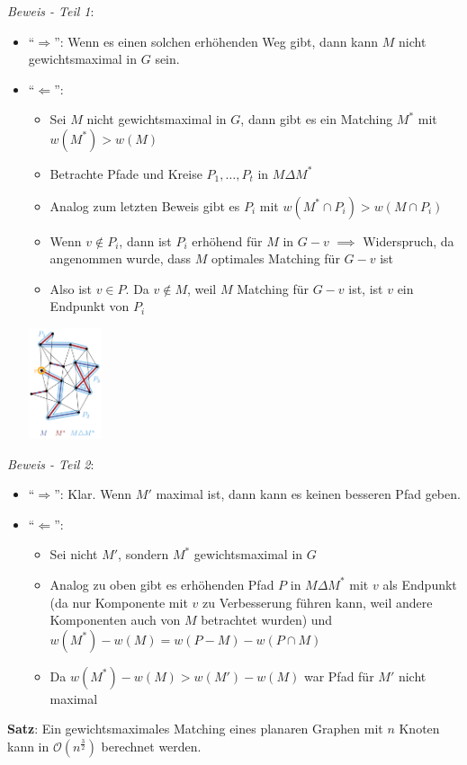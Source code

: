 \textit{Beweis - Teil 1}:
 \begin{itemize}
 	\item \enquote{$\Rightarrow$}: Wenn es einen solchen erhöhenden Weg gibt, dann kann $M$ nicht gewichtsmaximal in $G$ sein.
 	\item \enquote{$\Leftarrow$}:
 	\begin{itemize}
 		\item Sei $M$ nicht gewichtsmaximal in $G$, dann gibt es ein Matching $M^*$ mit $w(M^*)>w(M)$
 		\item Betrachte Pfade und Kreise $P_1,\ldots,P_t$ in $M\Delta M^*$
 		\item Analog zum letzten Beweis gibt es $P_i$ mit $w(M^*\cap P_i)>w(M\cap P_i)$
 		\item Wenn $v\notin P_i$, dann ist $P_i$ erhöhend für $M$ in $G-v$ $\implies$ Widerspruch, da angenommen wurde, dass $M$ optimales Matching für $G-v$ ist
 		\item Also ist $v\in P$. Da $v\notin M$, weil $M$ Matching für $G-v$ ist, ist $v$ ein Endpunkt von $P_i$
 	\end{itemize}
	 \begin{center}
	 	\includegraphics[width=0.17\textwidth]{images/moag2.png}
	 \end{center}
 \end{itemize}
\bigskip
\textit{Beweis - Teil 2}: 
\begin{itemize}
	\item \enquote{$\Rightarrow$}: Klar. Wenn $M'$ maximal ist, dann kann es keinen besseren Pfad geben.
	\item \enquote{$\Leftarrow$}: 
	\begin{itemize}
		\item Sei nicht $M'$, sondern $M^*$ gewichtsmaximal in $G$
		\item Analog zu oben gibt es erhöhenden Pfad $P$ in $M\Delta M^*$ mit $v$ als Endpunkt (da nur Komponente mit $v$ zu Verbesserung führen kann, weil andere Komponenten auch von $M$ betrachtet wurden) und $w(M^*)-w(M)=w(P-M)-w(P\cap M)$
		\item Da $w(M^*)-w(M)>w(M')-w(M)$ war Pfad für $M'$ nicht maximal
	\end{itemize}
\end{itemize}
\bigskip
\textbf{Satz}: Ein gewichtsmaximales Matching eines planaren Graphen mit $n$ Knoten kann in $\mathcal{O}(n^{\frac{3}{2}})$ berechnet werden.


